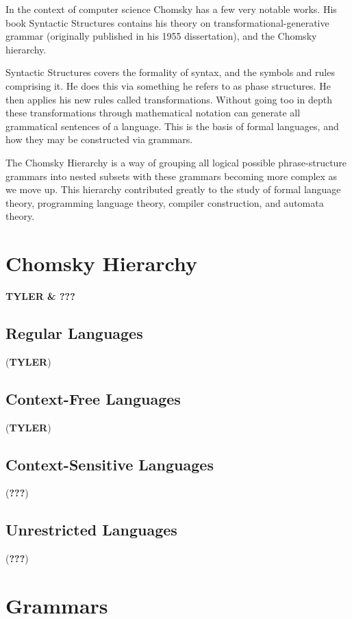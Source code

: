 \documentclass{article}
\begin{document}
In the context of computer science Chomsky has a few very notable works. 
His book Syntactic Structures contains his theory on transformational-generative grammar (originally published in his 1955 dissertation), and the Chomsky hierarchy.
\medskip

Syntactic Structures covers the formality of syntax, and the symbols and rules comprising it. He does this via something he refers to as phase structures. 
He then applies his new rules called transformations. Without going too in depth these transformations through mathematical notation can generate all grammatical sentences of a language. 
This is the basis of formal languages, and how they may be constructed via grammars. 
\medskip

The Chomsky Hierarchy is a way of grouping all logical possible phrase-structure grammars into nested subsets with these grammars becoming more complex as we move up. 
This hierarchy contributed greatly to the study of formal language theory, programming language theory, compiler construction, and automata theory.


\section{Chomsky Hierarchy}  
\textbf{TYLER \& ???}

\subsection{Regular Languages} (\textbf{TYLER})

\subsection{Context-Free Languages} (\textbf{TYLER})

\subsection{Context-Sensitive Languages} (\textbf{???})

\subsection{Unrestricted Languages} (\textbf{???})

\section{Grammars}
\medskip
\end{document}
